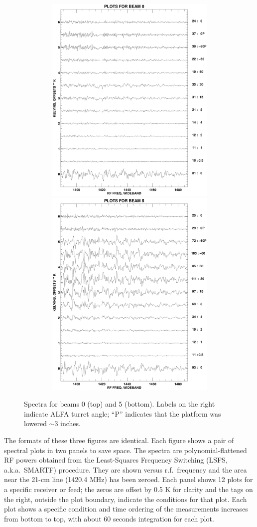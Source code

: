 \documentclass[psfig,preprint]{aastex}
\begin{document}
\begin{figure}[!p]
\begin{center}
\includegraphics[width=6in, height=4in]{beamplot0.ps}   
\includegraphics[width=6in, height=4in]{beamplot5.ps}   
\end{center}
\caption{Spectra for beams 0 (top) and 5 (bottom). Labels on the right
indicate ALFA turret angle; ``P'' indicates that the platform was
lowered $\sim 3$ inches. \label{feed05}}
\end{figure}

	The formats of these three figures are identical.  Each figure
shows a pair of spectral plots in two panels to save space.  The spectra
are polynomial-flattened RF powers obtained from the Least-Squares
Frequency Switching (LSFS, a.k.a.\ SMARTF) procedure.  They are shown
versus r.f.\ frequency and the area near the 21-cm line (1420.4 MHz) has
been zeroed.  Each panel shows 12 plots for a specific receiver or feed;
the zeros are offset by 0.5 K for clarity and the tags on the right,
outside the plot boundary, indicate the conditions for that plot.  Each
plot shows a specific condition and time ordering of the measurements
increases from bottom to top, with about 60 seconds integration for each
plot. 
\end{document}
